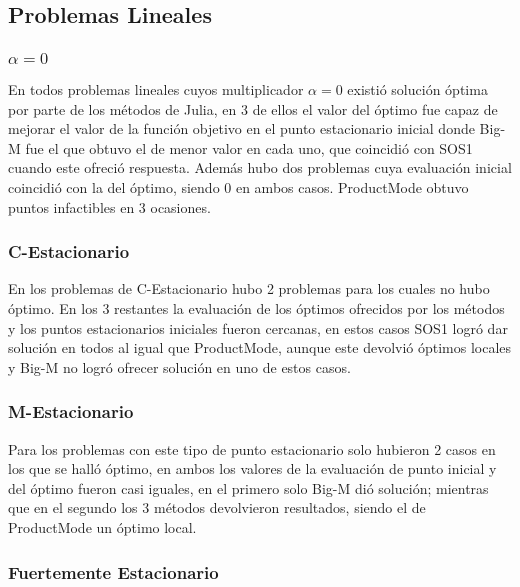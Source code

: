 \subsection{Problemas Lineales} 
  

\subsubsection{$\alpha =0$}

En todos problemas lineales cuyos multiplicador $\alpha=0$ existió solución óptima 
por parte de los métodos de Julia, en 3 de ellos el valor del óptimo fue capaz de mejorar el valor de la función objetivo en el punto estacionario inicial donde Big-M fue el que obtuvo el de menor valor en cada uno, que coincidió con SOS1 cuando este ofreció respuesta. Además hubo dos problemas cuya evaluación inicial coincidió con la del óptimo, siendo 0 en ambos casos. ProductMode obtuvo puntos infactibles en 3 ocasiones. 




\subsubsection{C-Estacionario}

En los problemas de C-Estacionario hubo 2 problemas para los cuales no hubo óptimo. En los 3 restantes la evaluación de los óptimos ofrecidos por los métodos y los puntos estacionarios iniciales fueron cercanas, en estos casos SOS1 logró dar solución en todos al igual que ProductMode, aunque este devolvió óptimos locales y   Big-M no logró ofrecer solución en uno de estos casos.


 

\subsubsection{M-Estacionario}

Para los problemas con este tipo de punto estacionario solo hubieron 2 casos en los que se halló óptimo, en ambos los valores de la evaluación de punto inicial y del óptimo fueron casi iguales, en el primero solo Big-M dió solución; mientras que en el segundo los 3 métodos devolvieron resultados, siendo el de ProductMode un óptimo local.  
  
\subsubsection{Fuertemente Estacionario}


